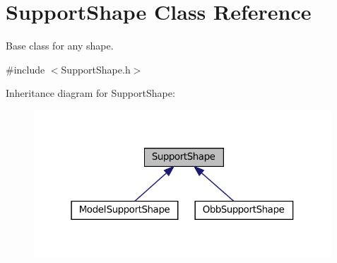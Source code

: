 \hypertarget{classSupportShape}{}\section{Support\+Shape Class Reference}
\label{classSupportShape}


Base class for any shape.  




{\ttfamily \#include $<$Support\+Shape.\+h$>$}



Inheritance diagram for Support\+Shape\+:
\nopagebreak
\begin{figure}[H]
\begin{center}
\leavevmode
\includegraphics[width=316pt]{classSupportShape__inherit__graph}
\end{center}
\end{figure}
